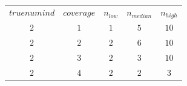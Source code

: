 \begin{table}[H]
\begin{tabular}{ccccc}
$truenumind$ & $coverage$ & $n_{low}$ & $n_{median}$ & $n_{high}$\\
$2$ & $1$ & $1$ & $5$ & $10$\\
$2$ & $2$ & $2$ & $6$ & $10$\\
$2$ & $3$ & $2$ & $3$ & $10$\\
$2$ & $4$ & $2$ & $2$ & $3$\\
\end{tabular}
\end{table}
 